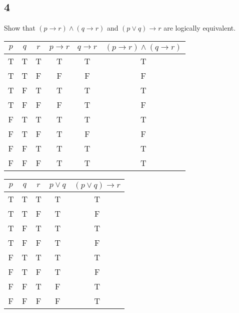 \documentclass[letterpaper, 12pt]{math}
\begin{document}
\subsection*{4}
Show that \( (p \to r) \wedge (q \to r) \) and \( (p \vee q) \to r \) are
logically equivalent.
\begin{center}
  \begin{tabular}{|c|c|c|c|c|c|}
    \hline
    \( p \) & \( q \) & \( r \) & \( p \to r \) & \( q \to r \) &
    \( (p \to r) \wedge (q \to r) \) \\ \hline
    T & T & T & T & T & T \\ \hline
    T & T & F & F & F & F \\ \hline
    T & F & T & T & T & T \\ \hline
    T & F & F & F & T & F \\ \hline
    F & T & T & T & T & T \\ \hline
    F & T & F & T & F & F \\ \hline
    F & F & T & T & T & T \\ \hline
    F & F & F & T & T & T \\ \hline
  \end{tabular}
\end{center}
\begin{center}
  \begin{tabular}{|c|c|c|c|c|}
    \hline
    \( p \) & \( q \) & \( r \) & \( p \vee q \) & \( (p \vee q) \to r \)
        \\ \hline
    T & T & T & T & T \\ \hline
    T & T & F & T & F \\ \hline
    T & F & T & T & T \\ \hline
    T & F & F & T & F \\ \hline
    F & T & T & T & T \\ \hline
    F & T & F & T & F \\ \hline
    F & F & T & F & T \\ \hline
    F & F & F & F & T \\ \hline
  \end{tabular}
\end{center}
\end{document}
